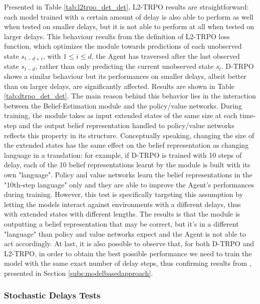                 Presented in Table \ref{tab:l2trpo_det_det}, L2-TRPO results are straightforward: each model trained with a certain amount of delay is also able to perform as well when tested on smaller delays, but it is not able to perform at all when tested on larger delays. This behaviour results from the definition of L2-TRPO loss function, which optimizes the module towards predictions of each unobserved state $s_{t-d+i}$, with $1 \leq i \leq d$, the Agent has traversed after the last observed state $s_{t-d}$, rather than only predicting the current unobserved state $s_t$. \newline
                D-TRPO shows a similar behaviour but its performances on smaller delays, albeit better than on larger delays, are significantly affected. Results are shown in Table \ref{tab:dtrpo_det_det}. The main reason behind this behavior lies in the interaction between the Belief-Estimation module and the policy/value networks. During training, the module takes as input extended states of the same size at each time-step and the output belief representation handled to policy/value networks reflects this property in its structure. Conceptually speaking, changing the size of the extended states has the same effect on the belief representation as changing language in a translation: for example, if D-TRPO is trained with 10 steps of delay, each of the 10 belief representations learnt by the module is built with its own "language". Policy and value networks learn the belief representations in the "10th-step language" only and they are able to improve the Agent's performances during training. However, this test is specifically targeting this assumption by letting the models interact against environments with a different delays, thus with extended states with different lengths. The results is that the module is outputting a belief representation that may be correct, but it's in a different "language" than policy and value networks expect and the Agent is not able to act accordingly. \newline
                At last, it is also possible to observe that, for both D-TRPO and L2-TRPO, in order to obtain the best possible performance we need to train the model with the same exact number of delay steps, thus confirming results from , presented in Section \ref{subs:modelbasedapproach}.
                
            \subsubsection{Stochastic Delays Tests}
            
